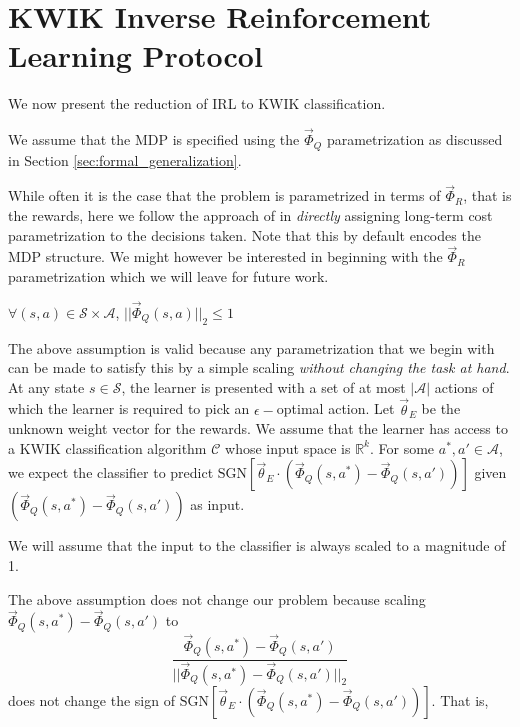 \section{KWIK Inverse Reinforcement Learning Protocol}


We now present the reduction of IRL to KWIK classification. 
\begin{assumption}
We assume that the MDP is specified using the $\vec{\Phi}_Q$ parametrization as discussed in Section \ref{sec:formal_generalization}. 
\end{assumption}

While often it is the case that the problem is parametrized in terms of $\vec{\Phi}_R$, that is the rewards, here we follow the approach of \citet{DBLP:conf/icra/SilverBS12} in \textit{directly} assigning long-term cost parametrization to the decisions taken. Note that this by default encodes the MDP structure. We might however be interested in beginning with the $\vec{\Phi}_R$ parametrization which we will leave for future work. \\

\begin{assumption}
$\forall (s,a) \in \mathcal{S} \times \mathcal{A}$,  $||\vec{\Phi}_Q(s,a)||_2 \leq 1$  
\end{assumption}

The above assumption is valid because any parametrization that we begin with can be made to satisfy this by a simple scaling \textit{without  changing the task at hand}.\\


At any state $s \in \mathcal{S}$, the learner is presented with a set of at most $|\mathcal{A}|$ actions of which the learner is required to pick an $\epsilon-$optimal action. Let $\vec{\theta}_E$ be the unknown weight vector for the rewards.  We assume that the learner has access to a KWIK classification algorithm $\mathcal{C}$ whose input space is $\mathbb{R}^k$. For some $a^*,a' \in \mathcal{A}$, we expect the classifier to predict $\text{SGN}[\vec{\theta}_E \cdot(\vec{\Phi}_Q(s,a^*) - \vec{\Phi}_Q(s,a'))]$ given $(\vec{\Phi}_Q(s,a^*) - \vec{\Phi}_Q(s,a'))$ as input. 

\begin{assumption}
We will assume that the input to the classifier is always scaled to a magnitude of 1. 
\end{assumption}

The above assumption does not change our problem because scaling $\vec{\Phi}_Q(s,a^*) - \vec{\Phi}_Q(s,a')$ to \[\frac{\vec{\Phi}_Q(s,a^*) - \vec{\Phi}_Q(s,a')}{||\vec{\Phi}_Q(s,a^*) - \vec{\Phi}_Q(s,a') ||_2}\]
does not change the sign of $\text{SGN}[\vec{\theta}_E \cdot(\vec{\Phi}_Q(s,a^*) - \vec{\Phi}_Q(s,a'))]$.
That is,

